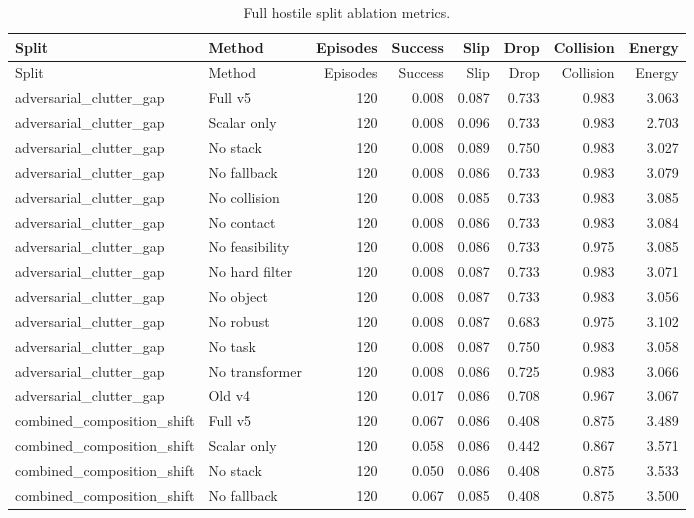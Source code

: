 {\scriptsize
\setlength{\tabcolsep}{2.5pt}
\begin{longtable}{llrrrrrr}
\caption{Full hostile split ablation metrics.}\label{tab:full-ablation}\\
\toprule
Split & Method & Episodes & Success & Slip & Drop & Collision & Energy \\
\midrule
\endfirsthead
\toprule
Split & Method & Episodes & Success & Slip & Drop & Collision & Energy \\
\midrule
\endhead
adversarial\_clutter\_gap & Full v5 & 120 & 0.008 & 0.087 & 0.733 & 0.983 & 3.063 \\
adversarial\_clutter\_gap & Scalar only & 120 & 0.008 & 0.096 & 0.733 & 0.983 & 2.703 \\
adversarial\_clutter\_gap & No stack & 120 & 0.008 & 0.089 & 0.750 & 0.983 & 3.027 \\
adversarial\_clutter\_gap & No fallback & 120 & 0.008 & 0.086 & 0.733 & 0.983 & 3.079 \\
adversarial\_clutter\_gap & No collision & 120 & 0.008 & 0.085 & 0.733 & 0.983 & 3.085 \\
adversarial\_clutter\_gap & No contact & 120 & 0.008 & 0.086 & 0.733 & 0.983 & 3.084 \\
adversarial\_clutter\_gap & No feasibility & 120 & 0.008 & 0.086 & 0.733 & 0.975 & 3.085 \\
adversarial\_clutter\_gap & No hard filter & 120 & 0.008 & 0.087 & 0.733 & 0.983 & 3.071 \\
adversarial\_clutter\_gap & No object & 120 & 0.008 & 0.087 & 0.733 & 0.983 & 3.056 \\
adversarial\_clutter\_gap & No robust & 120 & 0.008 & 0.087 & 0.683 & 0.975 & 3.102 \\
adversarial\_clutter\_gap & No task & 120 & 0.008 & 0.087 & 0.750 & 0.983 & 3.058 \\
adversarial\_clutter\_gap & No transformer & 120 & 0.008 & 0.086 & 0.725 & 0.983 & 3.066 \\
adversarial\_clutter\_gap & Old v4 & 120 & 0.017 & 0.086 & 0.708 & 0.967 & 3.067 \\
combined\_composition\_shift & Full v5 & 120 & 0.067 & 0.086 & 0.408 & 0.875 & 3.489 \\
combined\_composition\_shift & Scalar only & 120 & 0.058 & 0.086 & 0.442 & 0.867 & 3.571 \\
combined\_composition\_shift & No stack & 120 & 0.050 & 0.086 & 0.408 & 0.875 & 3.533 \\
combined\_composition\_shift & No fallback & 120 & 0.067 & 0.085 & 0.408 & 0.875 & 3.500 \\

\end{longtable}}
